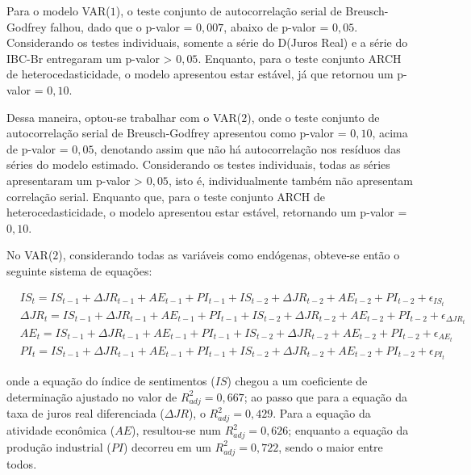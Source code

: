 
Para o modelo VAR($1$), o teste conjunto de autocorrelação serial de Breusch-Godfrey falhou, dado que o p-valor = $0,007$, abaixo de p-valor = $0,05$. Considerando os testes individuais, somente a série do D(Juros Real) e a série do IBC-Br entregaram um p-valor > $0,05$. Enquanto, para o teste conjunto ARCH de heterocedasticidade, o modelo apresentou estar estável, já que retornou um p-valor = $0,10$.

Dessa maneira, optou-se trabalhar com o VAR($2$), onde o teste conjunto de autocorrelação serial de Breusch-Godfrey apresentou como p-valor = $0,10$, acima de p-valor = $0,05$, denotando assim que não há autocorrelação nos resíduos das séries do modelo estimado. Considerando os testes individuais, todas as séries apresentaram um p-valor > $0,05$, isto é, individualmente também não apresentam correlação serial. Enquanto que, para o teste conjunto ARCH de heterocedasticidade, o modelo apresentou estar estável, retornando um p-valor = $0,10$.

No VAR($2$), considerando todas as variáveis como endógenas, obteve-se então o seguinte sistema de equações:

\begin{ceqn}
\begin{align} \label{eq:sist_equacoes_var_2}
&IS_{t} = IS_{t-1} + \Delta JR_{t-1} + AE_{t-1} + PI_{t-1} + IS_{t-2} + \Delta JR_{t-2} + AE_{t-2} + PI_{t-2} + \epsilon_{IS_{t}} \\
&\Delta JR_{t} = IS_{t-1} + \Delta JR_{t-1} + AE_{t-1} + PI_{t-1} + IS_{t-2} + \Delta JR_{t-2} + AE_{t-2} + PI_{t-2} + \epsilon_{\Delta JR_{t}} \\
&AE_{t} = IS_{t-1} + \Delta JR_{t-1} + AE_{t-1} + PI_{t-1} + IS_{t-2} + \Delta JR_{t-2} + AE_{t-2} + PI_{t-2} + \epsilon_{AE_{t}} \\
&PI_{t} = IS_{t-1} + \Delta JR_{t-1} + AE_{t-1} + PI_{t-1} + IS_{t-2} + \Delta JR_{t-2} + AE_{t-2} + PI_{t-2} + \epsilon_{PI_{t}}
\end{align}
\end{ceqn} onde a equação do índice de sentimentos ($IS$) chegou a um coeficiente de determinação ajustado no valor de $R_{adj}^2 = 0,667$; ao passo que para a equação da taxa de juros real diferenciada ($\Delta JR$), o $R_{adj}^2 = 0,429$. Para a equação da atividade econômica ($AE$), resultou-se num $R_{adj}^2 = 0,626$; enquanto a equação da produção industrial ($PI$) decorreu em um $R_{adj}^2 = 0,722$, sendo o maior entre todos. 

